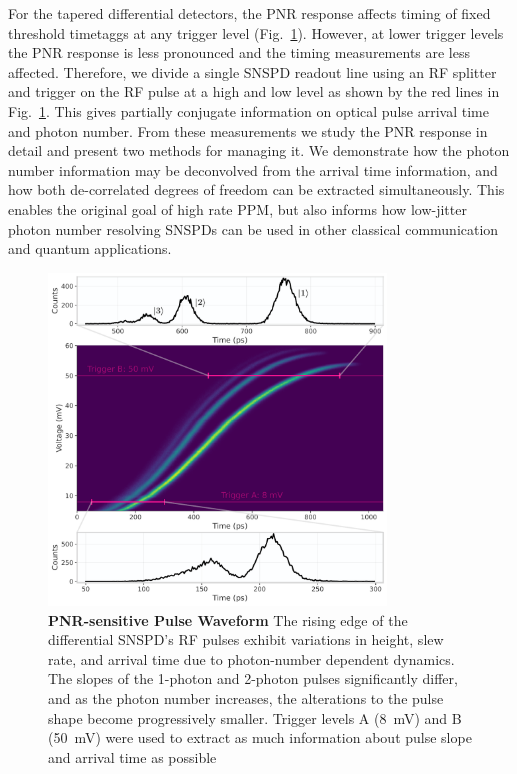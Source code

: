 \documentclass[11pt]{caltech_thesis} %
\begin{document}
For the tapered differential detectors, the PNR response affects timing of fixed threshold timetaggs at any trigger level (Fig.~\ref{fig:waveform}). However, at lower trigger levels the PNR response is less pronounced and the timing measurements are less affected. Therefore, we divide a single SNSPD readout line using an RF splitter and trigger on the RF pulse at a high and low level as shown by the red lines in Fig.~\ref{fig:waveform}. This gives partially conjugate information on optical pulse arrival time and photon number. From these measurements we study the PNR response in detail and present two methods for managing it. We demonstrate how the photon number information may be deconvolved from the arrival time information, and how both de-correlated degrees of freedom can be extracted simultaneously. This enables the original goal of high rate PPM, but also informs how low-jitter photon number resolving SNSPDs can be used in other classical communication and quantum applications.

\hypertarget{fig:waveform}{%
\begin{figure}
\centering
\includegraphics[width=0.8\textwidth,height=\textheight]{./chapter_04/figs/waveform_light.pdf}
\caption[{PNR-sensitive Pulse Waveform}]{\textbf{PNR-sensitive Pulse Waveform} The rising edge of the differential SNSPD's RF pulses exhibit variations in height, slew rate, and arrival time due to photon-number dependent dynamics. The slopes of the 1-photon and 2-photon pulses significantly differ, and as the photon number increases, the alterations to the pulse shape become progressively smaller. Trigger levels A (8~mV) and B (50~mV) were used to extract as much information about pulse slope and arrival time as possible}
\label{fig:waveform}
\end{figure}
}
\end{document}
